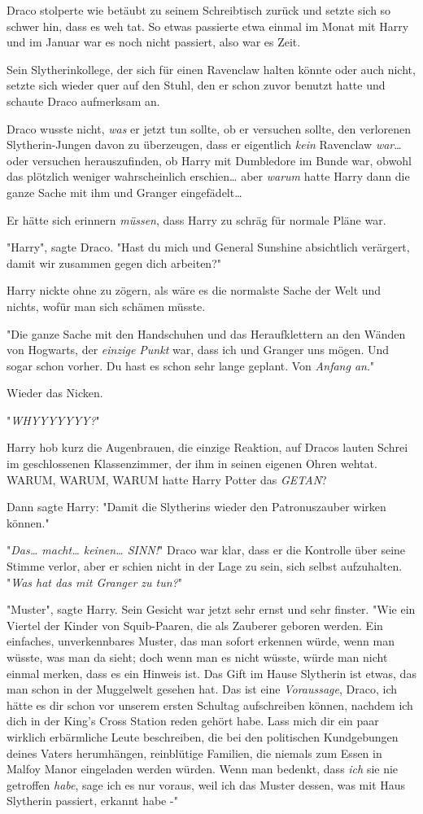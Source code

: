 {Draco stolperte wie betäubt zu seinem Schreibtisch zurück und setzte sich so schwer hin, dass es weh tat. So etwas passierte etwa einmal im Monat mit Harry und im Januar war es noch nicht passiert, also war es Zeit.

Sein Slytherinkollege, der sich für einen Ravenclaw halten könnte oder auch nicht, setzte sich wieder quer auf den Stuhl, den er schon zuvor benutzt hatte und schaute Draco aufmerksam an.

Draco wusste nicht, \emph{was} er jetzt tun sollte, ob er versuchen sollte, den verlorenen Slytherin-Jungen davon zu überzeugen, dass er eigentlich \emph{kein} Ravenclaw \emph{war}… oder versuchen herauszufinden, ob Harry mit Dumbledore im Bunde war, obwohl das plötzlich weniger wahrscheinlich erschien… aber \emph{warum} hatte Harry dann die ganze Sache mit ihm und Granger eingefädelt…

Er hätte sich erinnern \emph{müssen}, dass Harry zu schräg für normale Pläne war.

"Harry", sagte Draco. "Hast du mich und General Sunshine absichtlich verärgert, damit wir zusammen gegen dich arbeiten?"

Harry nickte ohne zu zögern, als wäre es die normalste Sache der Welt und nichts, wofür man sich schämen müsste.

"Die ganze Sache mit den Handschuhen und das Heraufklettern an den Wänden von Hogwarts, der \emph{einzige Punkt} war, dass ich und Granger uns mögen. Und sogar schon vorher. Du hast es schon sehr lange geplant. Von \emph{Anfang an}."

Wieder das Nicken.

"\emph{WHYYYYYYY?}"

Harry hob kurz die Augenbrauen, die einzige Reaktion, auf Dracos lauten Schrei im geschlossenen Klassenzimmer, der ihm in seinen eigenen Ohren wehtat. WARUM, WARUM, WARUM hatte Harry Potter das \emph{GETAN}?

Dann sagte Harry: "Damit die Slytherins wieder den Patronuszauber wirken können."

"\emph{Das… macht… keinen… SINN!}" Draco war klar, dass er die Kontrolle über seine Stimme verlor, aber er schien nicht in der Lage zu sein, sich selbst aufzuhalten. "\emph{Was hat das mit Granger zu tun?}"

"Muster", sagte Harry. Sein Gesicht war jetzt sehr ernst und sehr finster. "Wie ein Viertel der Kinder von Squib-Paaren, die als Zauberer geboren werden. Ein einfaches, unverkennbares Muster, das man sofort erkennen würde, wenn man wüsste, was man da sieht; doch wenn man es nicht wüsste, würde man nicht einmal merken, dass es ein Hinweis ist. Das Gift im Hause Slytherin ist etwas, das man schon in der Muggelwelt gesehen hat. Das ist eine \emph{Voraussage}, Draco, ich hätte es dir schon vor unserem ersten Schultag aufschreiben können, nachdem ich dich in der King's Cross Station reden gehört habe. Lass mich dir ein paar wirklich erbärmliche Leute beschreiben, die bei den politischen Kundgebungen deines Vaters herumhängen, reinblütige Familien, die niemals zum Essen in Malfoy Manor eingeladen werden würden. Wenn man bedenkt, dass \emph{ich} sie nie getroffen \emph{habe}, sage ich es nur voraus, weil ich das Muster dessen, was mit Haus Slytherin passiert, erkannt habe -"

}
